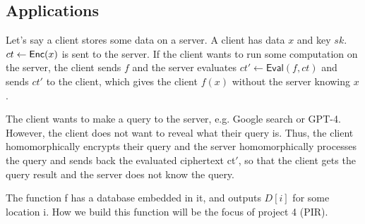 \subsection{Applications}
\begin{example}
    Let's say a client stores some data on a server. A client has data $x$ and key $sk$. $ct\leftarrow\operatorname{\mathsf{Enc}}(x)$ is sent to the server. If the client wants to run some computation on the server, the client sends $f$ and the server evaluates $ct' \leftarrow \mathsf{Eval}(f, ct)$ and sends $ct'$ to the client, which gives the client $f(x)$ without the server knowing $x$.
    
\end{example}

\begin{example}
    The client wants to make a query to the server, e.g. Google search or GPT-4. However, the client does not want to reveal what their query is. Thus, the client homomorphically encrypts their query and the server homomorphically processes the query and sends back the evaluated ciphertext ct$'$, so that the client gets the query result and the server does not know the query.


    The function f has a database embedded in it, and outputs $D[i]$ for some location i. How we build this function will be the focus of project 4 (PIR).
\end{example}

